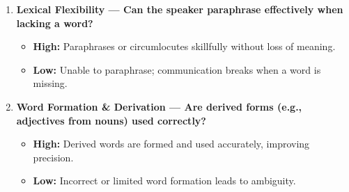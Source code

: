 \documentclass{report}
\begin{document}
\begin{enumerate}
  \item \textbf{Lexical Flexibility — Can the speaker paraphrase effectively when lacking a word?}
  \begin{itemize}
    \item \textbf{High:} Paraphrases or circumlocutes skillfully without loss of meaning.
    \item \textbf{Low:} Unable to paraphrase; communication breaks when a word is missing.
  \end{itemize}

  \item \textbf{Word Formation \& Derivation — Are derived forms (e.g., adjectives from nouns) used correctly?}
  \begin{itemize}
    \item \textbf{High:} Derived words are formed and used accurately, improving precision.
    \item \textbf{Low:} Incorrect or limited word formation leads to ambiguity.
  \end{itemize}
\end{enumerate}
\end{document}
